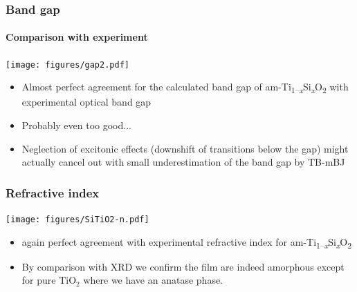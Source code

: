 \documentclass[noamsthm,8pt,t]{beamer}
\def\TiSiO{Ti\textsubscript{1--\itshape x}Si\textsubscript{\itshape x}O\textsubscript{2}}
\begin{document}
\begin{frame}
   \frametitle{Band gap}
   \framesubtitle{Comparison with experiment}

   \begin{center}
      \texttt{[image: figures/gap2.pdf]}
   \end{center}

   \begin{itemize}
      \item Almost perfect agreement for the calculated band gap of am-\TiSiO{} with experimental optical band gap
      \item<2> Probably even too good...
      \item<2> Neglection of excitonic effects (downshift of transitions below the gap) might actually cancel out with small underestimation of the band gap by TB-mBJ
   \end{itemize}
\end{frame}

\begin{frame}
\frametitle{Refractive index}
   \vspace{-0.3cm}
   \begin{center}
      \texttt{[image: figures/SiTiO2-n.pdf]}
   \end{center}

   \begin{itemize}
      \item again perfect agreement with experimental refractive index for am-\TiSiO{}
      \item<2> By comparison with XRD we confirm the film are indeed amorphous except for pure TiO$_2$ where we have an anatase phase.
   \end{itemize}

   \begin{center}
   \end{center}

\end{frame}
\end{document}
